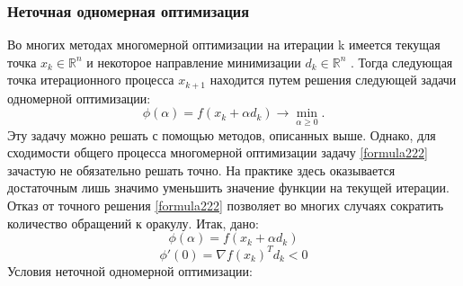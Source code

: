 \subsubsection{Неточная одномерная оптимизация}
Во многих методах многомерной оптимизации на итерации k имеется текущая точка $x_k \in \mathbb{R}^n$ и некоторое направление минимизации $d_k \in \mathbb{R}^n$ . Тогда следующая точка итерационного процесса $x_{k+1}$ находится путем решения следующей задачи одномерной оптимизации:
\begin{equation}
    \label{formula222}
    \phi(\alpha) = f(x_k+\alpha d_k)\to \min_{\alpha \geq 0}.
\end{equation}
Эту задачу можно решать с помощью методов, описанных выше. Однако, для сходимости общего процесса многомерной оптимизации задачу \ref{formula222} зачастую не обязательно решать точно. На практике здесь оказывается достаточным лишь значимо уменьшить значение функции на текущей итерации. Отказ от точного решения  \ref{formula222}  позволяет во многих случаях сократить количество обращений к оракулу.
\newline
Итак, дано:
$$\phi(\alpha) = f(x_k+\alpha d_k)$$
$$\phi'(0) = \nabla f(x_k)^T d_k < 0$$
Условия неточной одномерной оптимизации:
